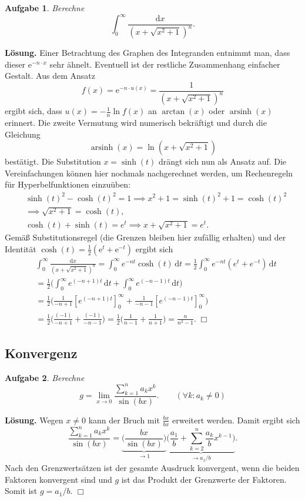 \documentclass[a4paper,10pt,fleqn,twoside]{scrartcl}
\numberwithin{equation}{section}
\newcommand{\ee}{\mathrm e}
\newcommand{\strong}[1]{{\normalfont\sffamily\bfseries #1}}
\theoremstyle{Aufgabe}
\newtheorem{Aufgabe}{\sffamily Aufgabe}[section]
\begin{document}
\begin{Aufgabe}
Berechne
\[\int_0^\infty \frac{\mathrm dx}{(x+\sqrt{x^2+1})^n}.\]
\end{Aufgabe}
\strong{Lösung.} Einer Betrachtung des Graphen des Integranden
entnimmt man, dass dieser $\ee^{-n\cdot x}$ sehr ähnelt.
Eventuell ist der restliche Zusammenhang einfacher Gestalt.
Aus dem Ansatz
\begin{equation}
f(x) = \ee^{-n\cdot u(x)} = \frac{1}{(x+\sqrt{x^2+1})^n}
\end{equation}
ergibt sich, dass $u(x) = -\tfrac{1}{n}\ln f(x)$ an $\arctan(x)$
oder $\operatorname{arsinh}(x)$ erinnert. Die zweite Vermutung
wird numerisch bekräftigt und durch die Gleichung
\begin{equation}
\operatorname{arsinh}(x) = \ln(x+\sqrt{x^2+1})
\end{equation}
bestätigt. Die Substitution $x=\sinh(t)$ drängt sich nun als Ansatz auf.
Die Vereinfachungen können hier nochmals nachgerechnet werden,
um Rechenregeln für Hyperbelfunktionen einzuüben:
\begin{align}
&\sinh(t)^2-\cosh(t)^2 = 1 \implies x^2+1 = \sinh(t)^2+1 = \cosh(t)^2\\
&\implies \sqrt{x^2+1} = \cosh(t),\\
& \cosh(t)+\sinh(t) = e^t \implies x+\sqrt{x^2+1} = e^t.
\end{align}
Gemäß Substitutionsregel (die Grenzen bleiben hier zufällig erhalten)
und der Identität $\cosh(t) = \tfrac{1}{2}(\ee^t+\ee^{-t})$ ergibt sich
\begin{align}
&\int_0^\infty \frac{\mathrm dx}{(x+\sqrt{x^2+1})^n}
= \int_0^\infty e^{-nt} \cosh(t) \,\mathrm dt
= \frac{1}{2}\int_0^\infty e^{-nt}(e^t+e^{-t})\,\mathrm dt\\
&= \frac{1}{2}\bigg(\int_0^\infty e^{(-n+1)t}\,\mathrm dt
+\int_0^\infty e^{(-n-1)t}\,\mathrm dt\bigg)\\
&= \frac{1}{2}\bigg(\frac{1}{-n+1}[e^{(-n+1)t}]_0^\infty
+ \frac{1}{-n-1}[e^{(-n-1)t}]_0^\infty\bigg)\\
&= \frac{1}{2}\bigg(\frac{(-1)}{-n+1}
+ \frac{(-1)}{-n-1}\bigg)
= \frac{1}{2}\bigg(\frac{1}{n-1}
+ \frac{1}{n+1}\bigg)
= \frac{n}{n^2-1}.\;\Box
\end{align}

\subsection{Konvergenz}
\begin{Aufgabe}
Berechne
\[g = \lim_{x\to 0}\frac{\sum_{k=1}^n a_k x^k}{\sin(bx)}.
\qquad(\forall k\colon a_k\ne 0)\]
\end{Aufgabe}
\noindent
\strong{Lösung.}
Wegen $x\ne 0$ kann der Bruch mit $\frac{bx}{bx}$ erweitert
werden. Damit ergibt sich
\[\frac{\sum_{k=1}^n a_k x^k}{\sin(bx)}
= \underbrace{\bigg(\frac{bx}{\sin(bx)}\bigg)}_{\to 1}
\underbrace{\bigg(\frac{a_1}{b}+\sum_{k=2}^n\frac{a_k}{b}x^{k-1}\bigg)}_{\to a_1/b}.
\]
Nach den Grenzwertsätzen ist der gesamte Ausdruck konvergent, wenn
die beiden Faktoren konvergent sind und $g$ ist das Produkt
der Grenzwerte der Faktoren. Somit ist $g=a_1/b$. $\Box$
\end{document}
